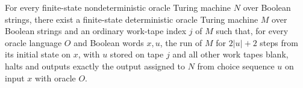 \begin{theorem}
\label{Turing.FinOracleNDTM.exists_choiceTM}
\leanok
{}
For every finite-state nondeterministic oracle Turing machine $N$ over Boolean strings,
there exist a finite-state deterministic oracle Turing machine $M$ over Boolean strings
and an ordinary work-tape index $j$ of $M$ such that, for every oracle language $O$ and
Boolean words $x,u$, the run of $M$ for $2|u|+2$ steps from its initial state on $x$,
with $u$ stored on tape $j$ and all other work tapes blank, halts and outputs exactly
the output assigned to $N$ from choice sequence $u$ on input $x$ with oracle $O$.
\end{theorem}
